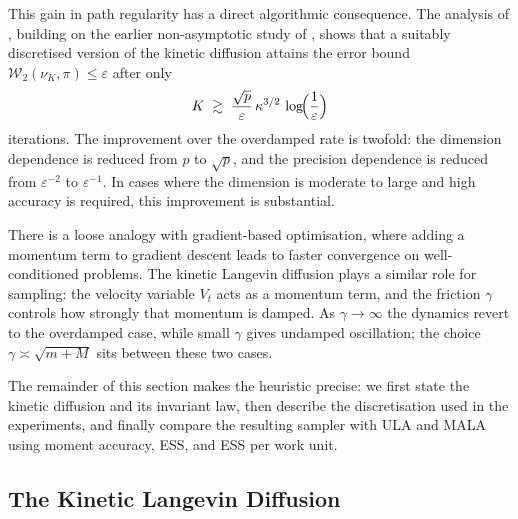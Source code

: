 \documentclass[a4paper,11pt, titlepage]{article}
\theoremstyle{definition}
\theoremstyle{plain}
\theoremstyle{remark}
\begin{document}
This gain in path regularity has a direct algorithmic consequence. The
analysis of \citet{DalalyanRiouDurand2020}, building on the earlier
non-asymptotic study of \citet{ChengEtAl2018}, shows that a suitably
discretised version of the kinetic diffusion attains the error bound
$\mathcal{W}_2(\nu_K, \pi) \leq \varepsilon$ after only
\[
K \;\gtrsim\; \frac{\sqrt{p}}{\varepsilon}\,\kappa^{3/2}\,
\log\!\Bigl(\frac{1}{\varepsilon}\Bigr)
\]
iterations. The improvement over the overdamped rate is twofold: the
dimension dependence is reduced from $p$ to $\sqrt{p}$, and the precision
dependence is reduced from $\varepsilon^{-2}$ to $\varepsilon^{-1}$. In
cases where the dimension is moderate to large and high accuracy is
required, this improvement is substantial.

There is a loose analogy with gradient-based optimisation, where adding a
momentum term to gradient descent leads to faster convergence on
well-conditioned problems. The kinetic Langevin diffusion plays a similar
role for sampling: the velocity variable $V_t$ acts as a momentum term, and
the friction $\gamma$ controls how strongly that momentum is damped. As
$\gamma \to \infty$ the dynamics revert to the overdamped case, while small
$\gamma$ gives undamped oscillation; the choice $\gamma \asymp \sqrt{m+M}$
sits between these two cases.

The remainder of this section makes the heuristic precise: we first
state the kinetic diffusion and its invariant law, then describe the
discretisation used in the experiments, and finally compare the resulting
sampler with ULA and MALA using moment accuracy, ESS, and ESS per work
unit.

\subsection{The Kinetic Langevin Diffusion}
\label{sec:ext-kinetic-sde}
\end{document}
